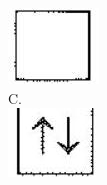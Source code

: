\documentclass[10pt]{article}
\begin{document}
\includegraphics[max width=\textwidth, center]{2025_10_23_76620c17ffac1ae9b35bg-12(14)}\\
C.\\
\includegraphics[max width=\textwidth, center]{2025_10_23_76620c17ffac1ae9b35bg-12(7)}\\
\end{document}
